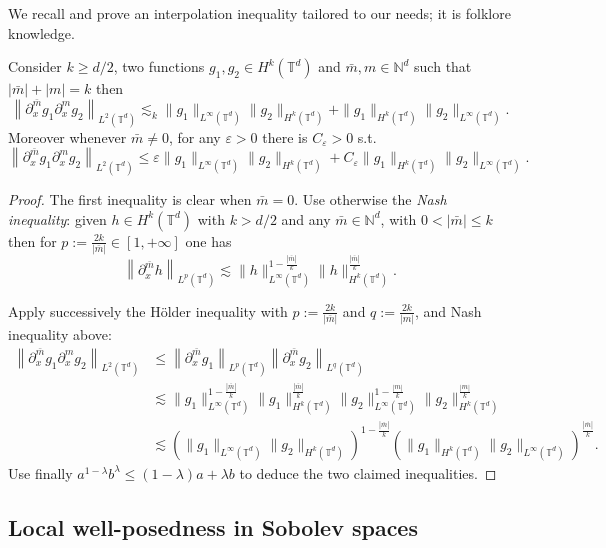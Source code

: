 \documentclass[AHL,Unicode,longabstracts,published]{cedram}
\newcommand{\N}{\mathbb{N}}
\newcommand{\T}{\mathbb{T}}
\newcommand*\eps{\varepsilon}
\begin{document}
We recall and prove an interpolation inequality tailored to our needs; it is folklore knowledge.

\begin{lemm}\label{lem:product}
Consider $k \ge d/2$, two functions $g_1, g_2 \in H^k(\T^d)$ and ${\bar m}, m \in \N^d$ such that $|{\bar m}| + |m| = k$ then
\[
\left\| \partial^{\bar m}_x g_1 \partial_x ^m g_2 \right\|_{L^2(\T^d)}
\lesssim_k \| g_1 \|_{L^\infty(\T^d)} \| g_2 \|_{H^k(\T^d)} +
\| g_1 \|_{H^k(\T^d)} \| g_2 \|_{L^\infty(\T^d)}.
\]
Moreover whenever ${\bar m} \not =0$, for any $\eps>0$ there is $C_\eps>0$ s.t.
\begin{equation}\label{eq:producteps}
\left\| \partial^{\bar m}_x g_1 \partial_x ^m g_2 \right\|_{L^2(\T^d)}
\le \eps \| g_1 \|_{L^\infty(\T^d)} \| g_2 \|_{H^k(\T^d)} + C_\eps \| g_1 \|_{H^k(\T^d)} \| g_2 \|_{L^\infty(\T^d)}.
\end{equation}
\end{lemm}


\begin{proof}
The first inequality is clear when $\bar m=0$. Use otherwise the \emph{Nash inequality}: given $h \in H^k(\T^d)$ with $k >d/2$ and any ${\bar m} \in \N^d$, with $0 < |{\bar m}| \le k$ then for $p := \frac{2k}{|{\bar m}|} \in [1,+\infty]$ one has
\[
\left\| \partial^{\bar m}_x h \right\|_{L^p(\T^d)} \lesssim \| h
\|_{L^\infty(\T^d)} ^{1-\frac{|{\bar m}|}k} \| h \|_{H^k(\T^d)} ^{\frac{|{\bar m}|}k}.
\]

Apply successively the H\"older inequality with $p := \frac{2k}{|{\bar m}|}$ and $q := \frac{2k}{|m|}$, and Nash inequality above:
\begin{align*}
\left\| \partial^{\bar m}_x g_1 \partial_x ^m g_2 \right\|_{L^2(\T^d)} & \le \left\| \partial^{\bar m}_x g_1 \right\|_{L^p(\T^d)} \left\|
\partial^{\bar m}_x g_2 \right\|_{L^q(\T^d)} \\
& \lesssim \| g_1\|_{L^\infty(\T^d)} ^{1-\frac{|{\bar m}|}{k}}
\| g_1 \|_{H^k(\T^d)}^{\frac{|{\bar m}|}k} \| g_2
\|_{L^\infty(\T^d)} ^{1-\frac{|m|}k} \| g_2 \|_{H^k(\T^d)} ^{\frac{|m|}k} \\
& \lesssim \left(\| g_1\|_{L^\infty(\T^d)} \| g_2
\|_{H^k(\T^d)}\right)^{1-\frac{|{\bar m}|}k}
\left(\| g_1 \|_{H^k(\T^d)} \| g_2\|_{L^\infty(\T^d)}
\right)^{\frac{|{\bar m}|}k}.
\end{align*}
Use finally $a^{1-\lambda} b^\lambda \le (1-\lambda)a + \lambda b$ to deduce the two claimed inequalities.
\end{proof}

\subsection{Local well-posedness in Sobolev spaces}\label{sec:local-wellp-sobol}
\end{document}
